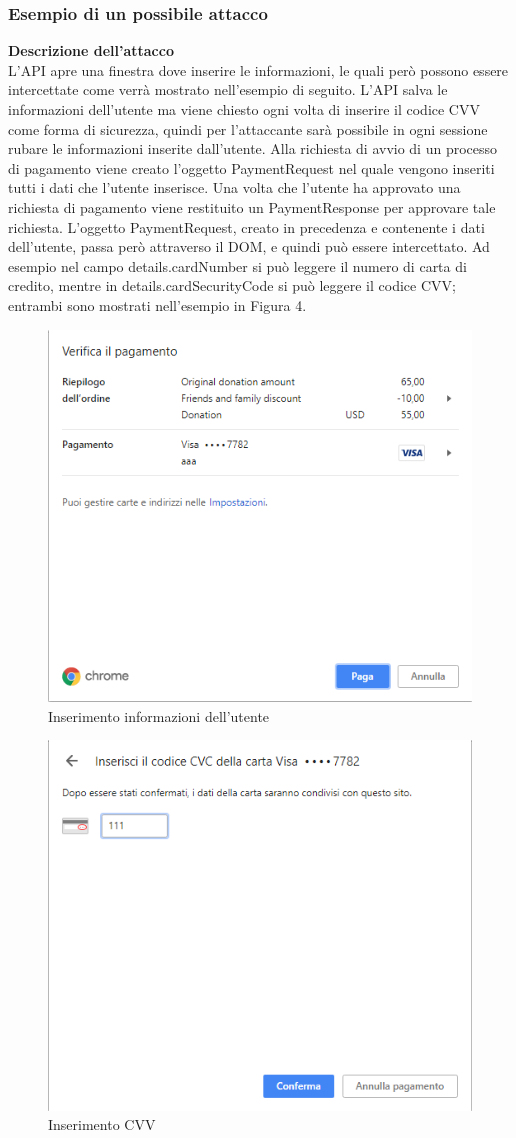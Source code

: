 \documentclass[11pt ,a4paper , twoside , openright ]{article}
\begin{document}
\subsubsection{Esempio di un possibile attacco}
\textbf{Descrizione dell'attacco}
\\
L'API apre una finestra dove inserire le informazioni, le quali però possono essere intercettate come verrà mostrato nell'esempio di seguito. 
L'API salva le informazioni dell'utente ma viene chiesto ogni volta di inserire il codice CVV come forma di sicurezza, quindi per l'attaccante sarà possibile in ogni sessione rubare le informazioni inserite dall'utente.
Alla richiesta di avvio di un processo di pagamento viene creato l'oggetto PaymentRequest nel quale vengono inseriti tutti i dati che l'utente inserisce. Una volta che l'utente ha approvato una richiesta di pagamento viene restituito un PaymentResponse per approvare tale richiesta. L'oggetto PaymentRequest, creato in precedenza e contenente i dati dell'utente, passa però attraverso il DOM, e quindi può essere intercettato. Ad esempio nel campo details.cardNumber si può leggere il numero di carta di credito, mentre in details.cardSecurityCode si può leggere il codice CVV; entrambi sono mostrati nell'esempio in Figura 4.
\begin{figure}[h]
	\centering
	\includegraphics[width=0.5\linewidth]{Chrome1}
	\caption{Inserimento informazioni dell'utente}
	\label{fig: Inserimento informazioni dell'utente}
\end{figure}
\begin{figure}[h]
	\centering
	\includegraphics[width=0.5\linewidth]{Chrome2}
	\caption{Inserimento CVV}
	\label{fig: Inserimento CVV}
\end{figure}
\end{document}
